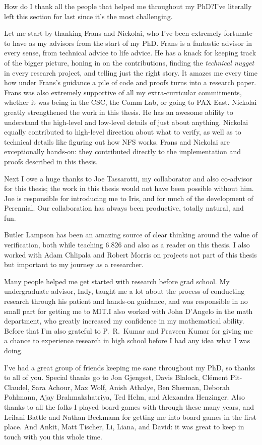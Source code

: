 How do I thank all the people that helped me throughout my PhD?\@ I've literally
left this section for last since it's the most challenging.

Let me start by thanking Frans and Nickolai, who I've been extremely fortunate
to have as my advisors from the start of my PhD. Frans is a fantastic advisor in
every sense, from technical advice to life advice. He has a knack for keeping
track of the bigger picture, honing in on the contributions, finding the
\emph{technical nugget} in every research project, and telling just the right
story. It amazes me every time how under Frans's guidance a pile of code and
proofs turns into a research paper. Frans was also extremely supportive of all
my extra-curricular commitments, whether it was being in the CSC, the Comm Lab,
or going to PAX East. Nickolai greatly strengthened the work in this thesis. He
has an awesome ability to understand the high-level and low-level details of
just about anything. Nickolai equally contributed to high-level direction about
what to verify, as well as to technical details like figuring out how NFS works.
Frans and Nickolai are exceptionally hands-on: they contributed directly to the
implementation and proofs described in this thesis.

Next I owe a huge thanks to Joe Tassarotti, my collaborator and also co-advisor for
this thesis; the work in this thesis would not have been possible without him. Joe is
responsible for introducing me to Iris, and for much of the development of
Perennial. Our collaboration has always been productive, totally natural, and
fun.

Butler Lampson has been an amazing source of clear thinking around the value of
verification, both while teaching 6.826 and also as a reader on this thesis. I
also worked with Adam Chlipala and Robert Morris on projects not part of this
thesis but important to my journey as a researcher.

Many people helped me get started with research before grad school. My
undergraduate advisor, Indy, taught me a lot about the process of conducting
research through his patient and hands-on guidance, and was responsible in no
small part for getting me to MIT.\@ I also worked with John D'Angelo in
the math department, who greatly increased my confidence in my mathematical
ability. Before that I'm also grateful to P.~R.~Kumar and Praveen
Kumar for giving me a chance to experience research in high school before I had
any idea what I was doing.

I've had a great group of friends keeping me sane throughout my PhD, so thanks
to all of you. Special thanks go to Jon Gjengset, Davis Blalock, Cl\'ement
Pit-Claudel, Sara Achour, Max Wolf, Anish Athalye, Ben Sherman, Deborah
Pohlmann, Ajay Brahmakshatriya, Ted Helm, and Alexandra Henzinger. Also thanks
to all the folks I played board games with through these many years, and Leilani
Battle and Nathan Beckmann for getting me into board games in the first place.
And Ankit, Matt Tischer, Li, Liana, and David: it was great to keep in touch
with you this whole time.


